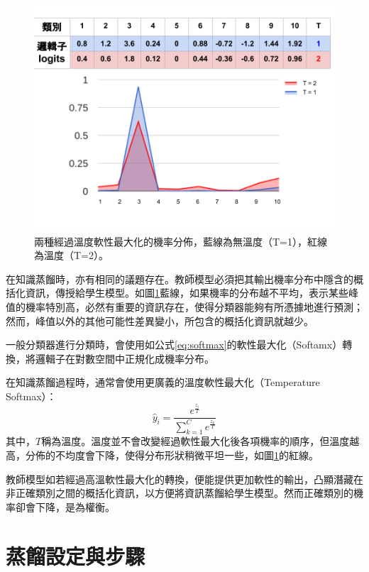 \begin{figure}[!h]
\centering
\includegraphics[scale=0.30]{images/chap5_impurity.png}
\caption{兩種經過溫度軟性最大化的機率分佈，藍線為無溫度（T=1），紅線為溫度（T=2）。}
\label{fig:chap5_impurity}
\end{figure}
在知識蒸餾時，亦有相同的議題存在。教師模型必須把其輸出機率分布中隱含的概括化資訊，傳授給學生模型。如圖\ref{fig:chap5_impurity}藍線，如果機率的分布越不平均，表示某些峰值的機率特別高，必然有重要的資訊存在，使得分類器能夠有所憑據地進行預測；然而，峰值以外的其他可能性差異變小，所包含的概括化資訊就越少。

一般分類器進行分類時，會使用如公式\ref{eq:softmax}的軟性最大化（Softamx）轉換，將邏輯子在對數空間中正規化成機率分布。

在知識蒸餾過程時，通常會使用更廣義的溫度軟性最大化（Temperature Softmax）：
\begin{equation}
\hat{y}_i = \frac{e^{\frac{z_i}{T} }}{\sum_{k=1}^{C}e^{\frac{z_k}{T}} }
\end{equation}
其中，$T$稱為溫度。溫度並不會改變經過軟性最大化後各項機率的順序，但溫度越高，分佈的不均度會下降，使得分布形狀稍微平坦一些，如圖\ref{fig:chap5_impurity}的紅線。

教師模型如若經過高溫軟性最大化的轉換，便能提供更加軟性的輸出，凸顯潛藏在非正確類別之間的概括化資訊，以方便將資訊蒸餾給學生模型。然而正確類別的機率卻會下降，是為權衡。

\section{蒸餾設定與步驟}

